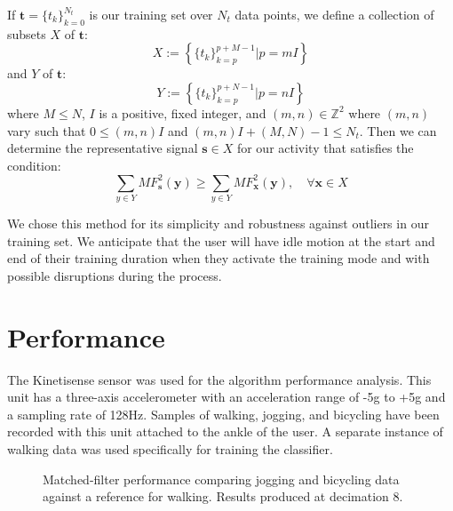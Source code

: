 \documentclass{sciposter}
\begin{document}
\begin{multicols}{3}
If $\textbf{t} = \{t_k\}_{k=0}^{N_t}$ is our training set over $N_t$ data points, we define a collection of subsets $X$ of $\textbf{t}$:
%
\begin{equation} \label{eq:X_subsets_of_training_eq}
X := \left \{ \{t_k\}_{k=p}^{p+M-1} | p=mI \right \}
\end{equation}
%
and $Y$ of $\textbf{t}$:
%
\begin{equation} \label{eq:Y_subsets_of_training_eq}
Y := \left \{ \{t_k\}_{k=p}^{p+N-1} | p=nI \right \}
\end{equation}
%
where $M \leq N$, $I$ is a positive, fixed integer, and $(m,n) \in \mathbb{Z}^2$ where $(m,n)$ vary such that $0 \leq (m,n)I$ and $(m,n)I + (M,N) - 1 \leq N_t$. Then we can determine the representative signal $\textbf{s} \in X$ for our activity that satisfies the condition:
%
\begin{equation} \label{eq:s_condition}
\sum_{y \in Y}MF^2_{\textbf{s}}(\textbf{y}) \geq \sum_{y \in Y}MF^2_{\textbf{x}}(\textbf{y}), \quad \forall \textbf{x} \in X
\end{equation}

We chose this method for its simplicity and robustness against outliers in our training set. We anticipate that the user will have idle motion at the start and end of their training duration when they activate the training mode and with possible disruptions during the process.

\section{Performance}
The Kinetisense sensor was used for the algorithm performance analysis.
This unit has a three-axis accelerometer with an acceleration range of -5g to +5g and a sampling rate of 128Hz.
Samples of walking, jogging, and bicycling have been recorded with this unit attached to the ankle of the user.
A separate instance of walking data was used specifically for training the classifier.

\begin{figure}[!ht]
\centering
{}
\caption{Matched-filter performance comparing jogging and bicycling data against a reference for walking. Results produced at decimation 8.}
  \label{fig:MF_performance}
\end{figure}


\end{multicols}
\end{document}
